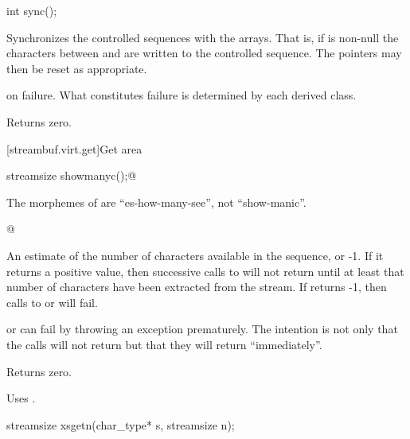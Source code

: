 %
\begin{itemdecl}
int sync();
\end{itemdecl}

\begin{itemdescr}
\pnum
\effects
Synchronizes the controlled sequences with the arrays.
That is, if
is non-null the characters between
and
are written to the controlled sequence.
The pointers may then be reset as appropriate.

\pnum
\returns
{} on failure.
What constitutes failure is determined by each derived class.

\pnum
{}
Returns zero.
\end{itemdescr}

[streambuf.virt.get]{Get area}

%
\begin{itemdecl}
streamsize showmanyc();@
\begin{footnote}
The morphemes of  are ``es-how-many-see'', not ``show-manic''.
\end{footnote}@
\end{itemdecl}

\begin{itemdescr}
\pnum
\returns
An estimate of the number of
characters available in the sequence, or -1.
If it returns
a positive value, then successive calls to
will not return
until at least that number of characters have been
extracted from the stream.
If
returns -1, then calls to
or
will fail.
\begin{footnote}
or
can fail by throwing an exception prematurely.
The intention is not only that the calls will not return
but that they will return ``immediately''.
\end{footnote}

\pnum
{}
Returns zero.

\pnum
\remarks
Uses
.
\end{itemdescr}

%
\begin{itemdecl}
streamsize xsgetn(char_type* s, streamsize n);
\end{itemdecl}

